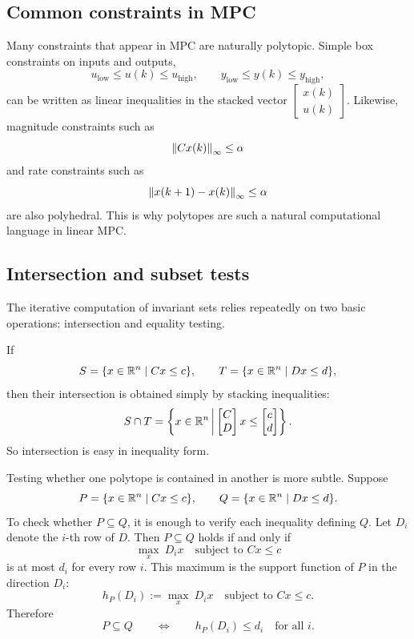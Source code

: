 \subsection{Common constraints in MPC}

Many constraints that appear in MPC are naturally polytopic. Simple box constraints on inputs and
outputs,
\[
u_{\mathrm{low}}\leq u(k)\leq u_{\mathrm{high}},
\qquad
y_{\mathrm{low}}\leq y(k)\leq y_{\mathrm{high}},
\]
can be written as linear inequalities in the stacked vector \(\begin{bmatrix}x(k)\\u(k)\end{bmatrix}\).
Likewise, magnitude constraints such as
\[
\left\lVert Cx(k) \right\rVert_\infty \leq \alpha
\]
and rate constraints such as
\[
\left\lVert x(k+1)-x(k) \right\rVert_\infty \leq \alpha
\]
are also polyhedral. This is why polytopes are such a natural computational language in linear
MPC.

\subsection{Intersection and subset tests}

The iterative computation of invariant sets relies repeatedly on two basic operations: intersection
and equality testing.

If
\[
S=\{x\in \mathbb{R}^n \mid Cx\leq c\},
\qquad
T=\{x\in \mathbb{R}^n \mid Dx\leq d\},
\]
then their intersection is obtained simply by stacking inequalities:
\[
S\cap T
=
\left\{
x\in \mathbb{R}^n \,\middle|\,
\begin{bmatrix}
C\\D
\end{bmatrix}x
\leq
\begin{bmatrix}
c\\d
\end{bmatrix}
\right\}.
\]
So intersection is easy in inequality form.

Testing whether one polytope is contained in another is more subtle. Suppose
\[
P=\{x\in \mathbb{R}^n \mid Cx\leq c\},
\qquad
Q=\{x\in \mathbb{R}^n \mid Dx\leq d\}.
\]
To check whether \(P\subseteq Q\), it is enough to verify each inequality defining \(Q\).
Let \(D_i\) denote the \(i\)-th row of \(D\). Then \(P\subseteq Q\) holds if and only if
\[
\max_{x}\ D_i x
\quad \text{subject to } Cx\leq c
\]
is at most \(d_i\) for every row \(i\). This maximum is the support function of \(P\) in the
direction \(D_i\):
\[
h_P(D_i):=\max_x\ D_i x \quad \text{subject to } Cx\leq c.
\]
Therefore
\[
P\subseteq Q
\qquad \Longleftrightarrow \qquad
h_P(D_i)\leq d_i \quad \text{for all } i.
\]

